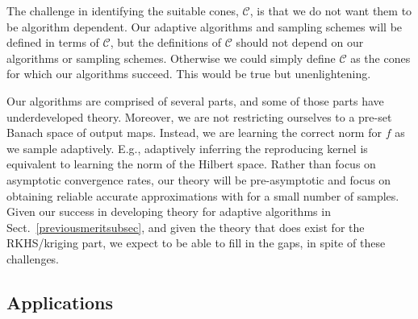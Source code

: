 \documentclass[11pt]{NSFamsart}
\newcommand{\calc}{{\mathcal{C}}}
\begin{document}
The challenge in identifying the suitable cones, $\calc$, is that we do not want them to be algorithm dependent.   Our adaptive algorithms and sampling schemes will be defined in terms of $\calc$, but the definitions of $\calc$ should not depend on our algorithms or sampling schemes.  Otherwise we could simply define $\calc$ as the cones for which our algorithms succeed.  This would be true but unenlightening.

Our algorithms are comprised of several parts, and some of those parts have underdeveloped theory. Moreover, we are not restricting ourselves to a pre-set Banach space of output maps.  Instead, we are learning the correct norm for $f$ as we sample adaptively. E.g., adaptively inferring the reproducing kernel is equivalent to learning the norm of the Hilbert space.  Rather than focus on asymptotic convergence rates, our theory will be pre-asymptotic and focus on obtaining reliable accurate approximations with for a small number of samples.  Given our success in developing theory for adaptive algorithms in Sect.\ \ref{previousmeritsubsec}, and given the theory that does exist for the RKHS/kriging part, we expect to be able to fill in the gaps, in spite of these challenges.


\subsection{Applications} \label{sec:Applications}

\end{document}
